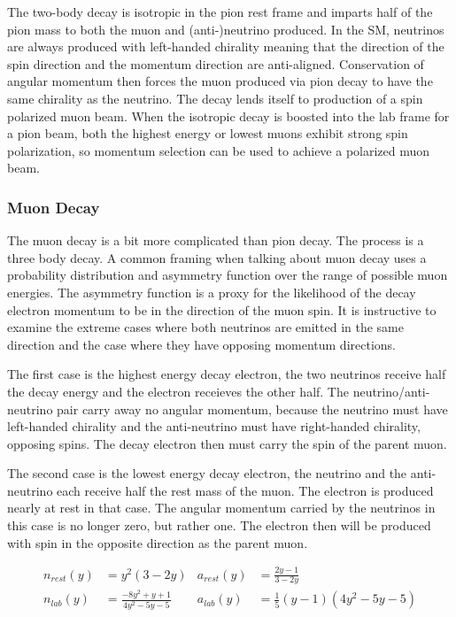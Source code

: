 The two-body decay is isotropic in the pion rest frame and imparts half of the pion mass to both the muon and (anti-)neutrino produced.  In the SM, neutrinos are always produced with left-handed chirality meaning that the direction of the spin direction and the momentum direction are anti-aligned.  Conservation of angular momentum then forces the muon produced via pion decay to have the same chirality as the neutrino.  The decay lends itself to production of a spin polarized muon beam.  When the isotropic decay is boosted into the lab frame for a pion beam, both the highest energy or lowest muons exhibit strong spin polarization, so momentum selection can be used to achieve a polarized muon beam. 

\subsubsection{Muon Decay}

The muon decay is a bit more complicated than pion decay.  The process is a three body decay.  A common framing when talking about muon decay uses a probability distribution and asymmetry function over the range of possible muon energies.  The asymmetry function is a proxy for the likelihood of the decay electron momentum to be in the direction of the muon spin.  It is instructive to examine the extreme cases where both neutrinos are emitted in the same direction and the case where they have opposing momentum directions.  

The first case is the highest energy decay electron, the two neutrinos receive half the decay energy and the electron receieves the other half.  The neutrino/anti-neutrino pair carry away no angular momentum, because the neutrino must have left-handed chirality and the anti-neutrino must have right-handed chirality, opposing spins.  The decay electron then must carry the spin of the parent muon.

The second case is the lowest energy decay electron, the neutrino and the anti-neutrino each receive half the rest mass of the muon.  The electron is produced nearly at rest in that case.  The angular momentum carried by the neutrinos in this case is no longer zero, but rather one.  The electron then will be produced with spin in the opposite direction as the parent muon.

\begin{align}
\label{eqn:muon-decay-distributions}
n_{rest}(y) & = y^2(3 - 2 y) & a_{rest}(y) & = \frac{2 y - 1}{3 - 2y} \\
n_{lab}(y) & = \frac{-8 y^2 + y + 1}{4 y^2 - 5y - 5} & a_{lab}(y) & = \tfrac{1}{5}(y - 1) (4 y^2 - 5y - 5)
\end{align}

